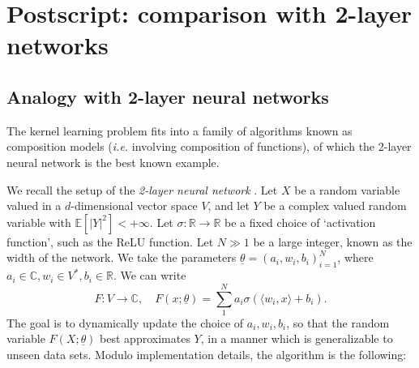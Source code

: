 \documentclass[a4paper]{article}
\theoremstyle{definition}
\newcommand{\ie}{\emph{i.e.} }
\newcommand{\R}{\mathbb{R}}
\newcommand{\C}{\mathbb{C}}
\newcommand{\E}{\mathbb{E}}
\newcommand{\1}{\mathbbm{1}}
\begin{document}
	
	
	
	
	
	\section*{Postscript: comparison with 2-layer networks}
	
	
	
	
	
	\subsection*{Analogy with 2-layer neural networks}
	
	
	
	
	
	
	The kernel learning problem fits into a family of algorithms known as composition models (\ie involving composition of functions), of which the 2-layer neural network is the best known example. 
	
	
	
	
	We recall the setup of the \emph{2-layer neural network} \cite{Bach}.  Let $X$ be a random variable valued in a $d$-dimensional vector space $V$, and let $Y$ be a complex valued random variable with $\E[|Y|^2]<+\infty$. Let $\sigma: \R\to \R$ be a fixed choice of `activation function', such as the ReLU function. Let $N\gg 1$ be a large integer, known as the width of the network. We take the parameters $\underline{\theta}=(a_i, w_i, b_i)_{i=1}^N$, where $a_i\in \C, w_i\in V^*, b_i\in \R$. We can write
	\[
	F: V\to \C,\quad	F(x; \underline{\theta} )= \sum_1^N a_i \sigma( \langle w_i, x\rangle + b_i).
	\]
	The goal is to 
	dynamically update the choice of $a_i, w_i, b_i$, so that the random variable $F(X; \underline{\theta})$ best approximates $Y$, in a manner which is generalizable to unseen data sets. Modulo implementation details, the algorithm is the following:
	
\end{document}
